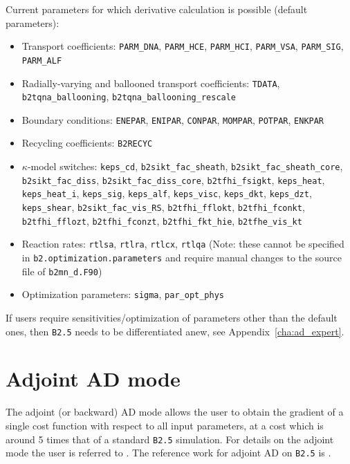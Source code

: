 \begin{sloppypar}
Current parameters for which derivative calculation is possible (default parameters):
\begin{itemize}
  \item Transport coefficients: {\tt PARM\_DNA}, {\tt PARM\_HCE}, {\tt PARM\_HCI}, {\tt PARM\_VSA}, {\tt PARM\_SIG}, {\tt PARM\_ALF}
  \item Radially-varying and ballooned transport coefficients: {\tt TDATA}, {\tt b2tqna\_ballooning}, {\tt b2tqna\_ballooning\_rescale}
  \item Boundary conditions: {\tt ENEPAR}, {\tt ENIPAR}, {\tt CONPAR}, {\tt MOMPAR}, {\tt POTPAR}, {\tt ENKPAR}
  \item Recycling coefficients: {\tt B2RECYC}
  \item $\kappa$-model switches: {\tt keps\_cd}, {\tt b2sikt\_fac\_sheath}, {\tt b2sikt\_fac\_sheath\_core}, {\tt b2sikt\_fac\_diss}, {\tt b2sikt\_fac\_diss\_core}, {\tt b2tfhi\_fsigkt}, {\tt keps\_heat}, {\tt keps\_heat\_i}, {\tt keps\_sig}, {\tt keps\_alf}, {\tt keps\_visc}, {\tt keps\_dkt}, {\tt keps\_dzt}, {\tt keps\_shear}, {\tt b2sikt\_fac\_vis\_RS}, {\tt b2tfhi\_fflokt}, {\tt b2tfhi\_fconkt}, {\tt b2tfhi\_fflozt}, {\tt b2tfhi\_fconzt}, {\tt b2tfhi\_fkt\_hie}, {\tt b2tfhe\_vis\_kt}
  \item Reaction rates: {\tt rtlsa}, {\tt rtlra}, {\tt rtlcx}, {\tt rtlqa} (Note: these cannot be specified in {\tt b2.optimization.parameters} and require manual changes to the source file of {\tt b2mn\_d.F90})
  \item Optimization parameters: {\tt sigma}, {\tt par\_opt\_phys}
\end{itemize}
\end{sloppypar}

If users require sensitivities/optimization of parameters other than the default ones, then {\tt B2.5} needs to be differentiated anew, see Appendix~\ref{cha:ad_expert}.

\section{Adjoint AD mode}\label{sec:adjointAd}

The adjoint (or backward) AD mode allows the user to obtain the gradient of a single cost function with respect to all input parameters, at a cost which is around 5 times that of a standard {\tt B2.5} simulation. For details on the adjoint mode the user is referred to \cite{griewank}. The reference work for adjoint AD on {\tt B2.5} is \cite{carlijcp}.

